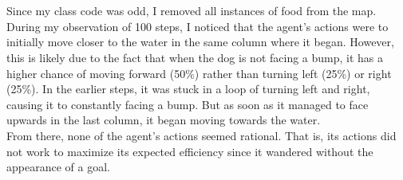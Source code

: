 \documentclass{article}
\begin{document}
    \section{}
        \begin{figure}[hbp]%
            \centering
            \hspace{1in}%
        \end{figure}
        Since my class code was odd, I removed all instances of food from the map. During my observation of 100 steps, I noticed that the agent's actions were to initially move closer to the water in the same column where it began. However, this is likely due to the fact that when the dog is not facing a bump, it has a higher chance of moving forward (50\%) rather than turning left (25\%) or right (25\%). In the earlier steps, it was stuck in a loop of turning left and right, causing it to constantly facing a bump. But as soon as it managed to face upwards in the last column, it began moving towards the water.\\

        From there, none of the agent's actions seemed rational. That is, its actions did not work to maximize its expected efficiency since it wandered without the appearance of a goal.\\
\end{document}
